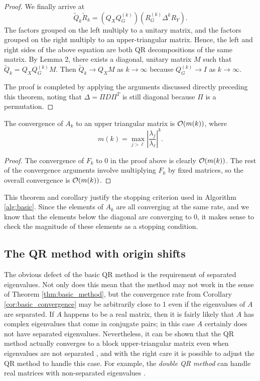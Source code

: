 \documentclass{article}
\newcommand{\Qt}{\widetilde{Q}}
\newcommand{\Rt}{\widetilde{R}}
\begin{document}
\begin{proof}
	We finally arrive at
	\begin{equation*}
		\Qt_k\Rt_k = \left(Q_XQ_G^{(k)}\right)\left(R_G^{(k)}\Delta^k R_Y\right).
	\end{equation*}
	The factors grouped on the left multiply to a unitary matrix, and the factors grouped on the right multiply to an upper-triangular matrix. Hence, the left and right sides of the above equation are both QR decompositions of the same matrix. By Lemma 2, there exists a diagonal, unitary matrix $M$ such that
	$\Qt_k = Q_XQ_G^{(k)}M$. Then $\Qt_k \to Q_XM$ as $k \to \infty$ because $Q_G^{(k)} \to I$ as $k \to \infty$.
	
	The proof is completed by applying the arguments discussed directly preceding this theorem, noting that $\Delta = \Pi D\Pi^T$ is still diagonal because $\Pi$ is a permutation.
\end{proof}

\begin{corollary}
	\label{cor:basic_convergence}
	The convergence of $A_k$ to an upper triangular matrix is $\mathcal{O}(m(k))$, where
	\begin{equation*}
		m(k) = \max_{j > \ell} \left|\frac{\lambda_j}{\lambda_\ell}\right|^k.
	\end{equation*}
\end{corollary}
\begin{proof}
	The convergence of $F_k$ to 0 in the proof above is clearly $\mathcal{O}(m(k))$. The rest of the convergence arguments involve multiplying $F_k$ by fixed matrices, so the overall convergence is $\mathcal{O}(m(k))$.
\end{proof}

\begin{remark}
	This theorem and corollary justify the stopping criterion used in Algorithm \ref{alg:basic}. Since the elements of $A_k$ are all converging at the same rate, and we know that the elements below the diagonal are converging to 0, it makes sense to check the magnitude of these elements as a stopping condition.
\end{remark}

\subsection{The QR method with origin shifts}

The obvious defect of the basic QR method is the requirement of separated eigenvalues. Not only does this mean that the method may not work in the sense of Theorem \ref{thm:basic_method}, but the convergence rate from Corollary \ref{cor:basic_convergence} may be arbitrarily close to 1 even if the eigenvalues of $A$ are separated. If $A$ happens to be a real matrix, then it is fairly likely that $A$ has complex eigenvalues that come in conjugate pairs; in this case $A$ certainly does not have separated eigenvalues. Nevertheless, it can be shown that the QR method actually converges to a block upper-triangular matrix even when eigenvalues are not separated \cite{wilkinson_1965}, and with the right care it is possible to adjust the QR method to handle this case. For example, the \textit{double QR method} can handle real matrices with non-separated eigenvalues \cite{ackleh_2009}.
\end{document}
